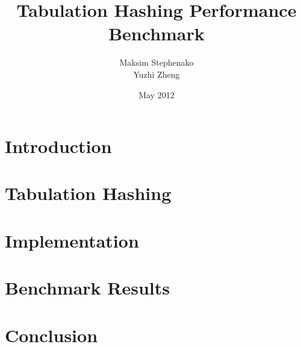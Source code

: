 \documentclass[12pt]{article}
\title{Tabulation Hashing Performance Benchmark}
\author{Maksim Stephenako \\ Yuzhi Zheng}
\date{May 2012}
\begin{document}
\setlength{\baselineskip}{1.25\baselineskip}

\ifpdf
{}
\else
{}
\fi

\maketitle

\section{Introduction}

\section{Tabulation Hashing}

\section{Implementation}

\section{Benchmark Results}

\section{Conclusion}



\end{document}
